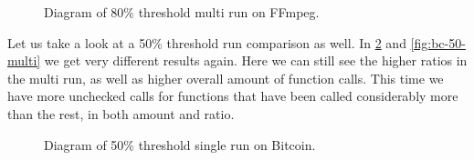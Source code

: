 \begin{figure}[H]
	\caption{Diagram of 80\% threshold multi run on FFmpeg.}
	\label{fig:ff-80-multi}
\end{figure}

Let us take a look at a 50\% threshold run comparison as well. In \cref{fig:bc-50-single} and \cref{fig:bc-50-multi} we get very different
results again. Here we can still see the higher ratios in the multi run, as well as higher overall amount of function calls. This time we
have more unchecked calls for functions that have been called considerably more than the rest, in both amount and ratio.

\begin{figure}[H]
	\caption{Diagram of 50\% threshold single run on Bitcoin.}
	\label{fig:bc-50-single}
\end{figure}

